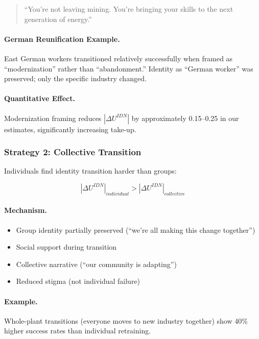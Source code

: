\begin{quote}
``You're not leaving mining. You're bringing your skills to the next 
generation of energy.''
\end{quote}

\paragraph{German Reunification Example.}
East German workers transitioned relatively successfully when framed as 
``modernization'' rather than ``abandonment.'' Identity as ``German worker'' 
was preserved; only the specific industry changed.

\paragraph{Quantitative Effect.}
Modernization framing reduces $|\Delta U^{IDN}|$ by approximately 0.15--0.25 
in our estimates, significantly increasing take-up.

\subsubsection{Strategy 2: Collective Transition}

Individuals find identity transition harder than groups:

\begin{equation}
|\Delta U^{IDN}|_{individual} > |\Delta U^{IDN}|_{collective}
\end{equation}

\paragraph{Mechanism.}
\begin{itemize}
    \item Group identity partially preserved (``we're all making this change together'')
    \item Social support during transition
    \item Collective narrative (``our community is adapting'')
    \item Reduced stigma (not individual failure)
\end{itemize}

\paragraph{Example.}
Whole-plant transitions (everyone moves to new industry together) show 
40\% higher success rates than individual retraining.

